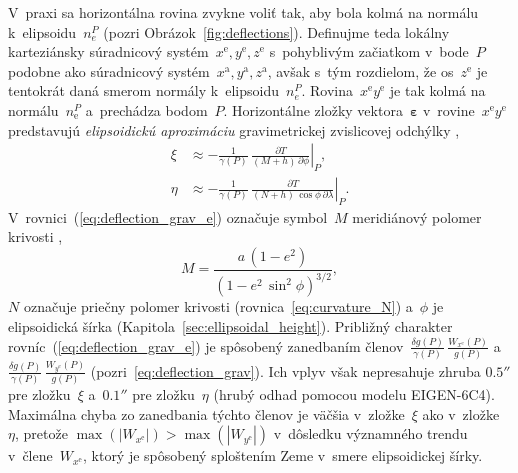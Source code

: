 \documentclass[a4paper, 12pt]{book}
\begin{document}
V~praxi sa horizontálna rovina zvykne voliť tak, aby bola kolmá na normálu 
k~elipsoidu~$n_e^P$ (pozri Obrázok~\ref{fig:deflections}).  Definujme teda 
lokálny karteziánsky súradnicový systém~$x^\mathrm{e}, y^\mathrm{e}, 
z^\mathrm{e}$ s~pohyblivým začiatkom v~bode~$P$ podobne ako súradnicový 
systém~$x^\mathrm{a}, y^\mathrm{a}, z^\mathrm{a}$, avšak s~tým rozdielom, že 
os~$z^\mathrm{e}$ je tentokrát daná smerom normály k~elipsoidu~$n_e^P$.  
Rovina~$x^\mathrm{e}y^{\mathrm{e}}$ je tak kolmá na normálu~$n^P_{\mathrm{e}}$ 
a~prechádza bodom~$P$.  Horizontálne zložky vektora~$\boldsymbol\varepsilon$ 
v~rovine~$x^\mathrm{e}y^\mathrm{e}$ predstavujú \emph{elipsoidickú aproximáciu} 
gravimetrickej zvislicovej odchýlky \parencite{Jekeli1999b},
%
\begin{equation}
\label{eq:deflection_grav_e}
\begin{split}
\xi &\approx -\frac{1}{\gamma(P)} \, \left.\frac{\partial T}{(M + h) \, 
\partial \phi}\right|_P{,}\\
%
\eta &\approx -\frac{1}{\gamma(P)} \, \left.\frac{\partial T}{(N + h) \, 
\cos\phi \, \partial \lambda}\right|_P{.}
\end{split}
\end{equation}
%
V~rovnici~(\ref{eq:deflection_grav_e}) označuje symbol~$M$ meridiánový polomer 
krivosti \parencite{TorgeGeodesy},
%
\begin{equation}
M = \frac{a \, (1 - e^2)}{\left(1 - e^2 \, \sin^2\phi \right)^{3 \slash 2}}{,}
\end{equation}
%
$N$ označuje priečny polomer krivosti (rovnica~\ref{eq:curvature_N}) a~$\phi$ 
je elipsoidická šírka (Kapitola~\ref{sec:ellipsoidal_height}).  Približný 
charakter rovníc~(\ref{eq:deflection_grav_e}) je spôsobený zanedbaním 
členov~$\frac{\delta g(P)}{\gamma(P)} \, \frac{W_{x^\mathrm{e}}(P)}{g(P)}$ 
a~$\frac{\delta g(P)}{\gamma(P)} \, \frac{W_{y^\mathrm{e}}(P)}{g(P)}$ 
(pozri~\ref{eq:deflection_grav}).  Ich vplyv však nepresahuje zhruba $0.5''$ 
pre zložku~$\xi$ a~$0.1''$ pre zložku~$\eta$ (hrubý odhad pomocou modelu 
EIGEN-6C4).  Maximálna chyba zo zanedbania týchto členov je väčšia 
v~zložke~$\xi$ ako v~zložke~$\eta$, pretože $\max(|W_{x^\mathrm{e}}|) 
> \max(|W_{y^\mathrm{e}}|)$ v~dôsledku významného trendu 
v~člene~$W_{x^\mathrm{e}}$, ktorý je spôsobený sploštením Zeme v~smere 
elipsoidickej šírky.
\end{document}
